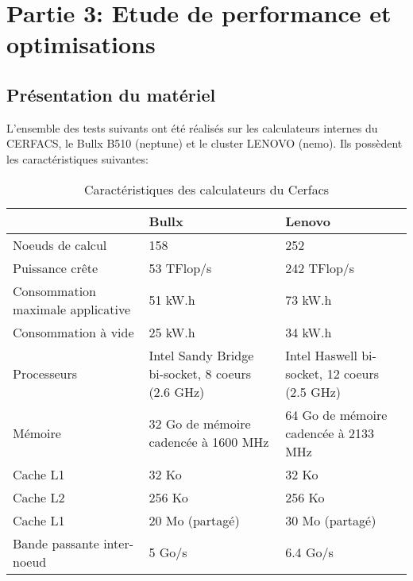 \section{Partie 3: Etude de performance et optimisations}
\subsection{Présentation du matériel}
L'ensemble des tests suivants ont été réalisés sur les calculateurs internes du CERFACS, le Bullx B510 (neptune) et le cluster LENOVO (nemo). Ils possèdent les caractéristiques suivantes:

\begin{table}[h]
  \begin{center}
    \begin{tabular}{|M{3.5cm}|M{5cm}|M{5cm}|}
      \hline
      & Bullx & Lenovo \\
      \hline
      Noeuds de calcul & 158 & 252 \\
      \hline
      Puissance crête & 53 TFlop/s & 242 TFlop/s \\
      \hline
      Consommation maximale applicative & 51 kW.h & 73 kW.h \\
      \hline
      Consommation à vide & 25 kW.h & 34 kW.h \\
      \hline
      Processeurs & Intel Sandy Bridge bi-socket, 8 coeurs (2.6 GHz) & Intel Haswell bi-socket, 12 coeurs (2.5 GHz) \\
      \hline
      Mémoire & 32 Go de mémoire cadencée à 1600 MHz & 64 Go de mémoire cadencée à 2133 MHz \\
      \hline
      Cache L1 & 32 Ko & 32 Ko \\
      \hline
      Cache L2 & 256 Ko & 256 Ko \\
      \hline
      Cache L1 & 20 Mo (partagé) & 30 Mo (partagé) \\
      \hline
      Bande passante inter-noeud & 5 Go/s & 6.4 Go/s \\
      \hline
    \end{tabular}
  \end{center}
  \caption{\label{tab:carac}Caractéristiques des calculateurs du Cerfacs}
\end{table}

